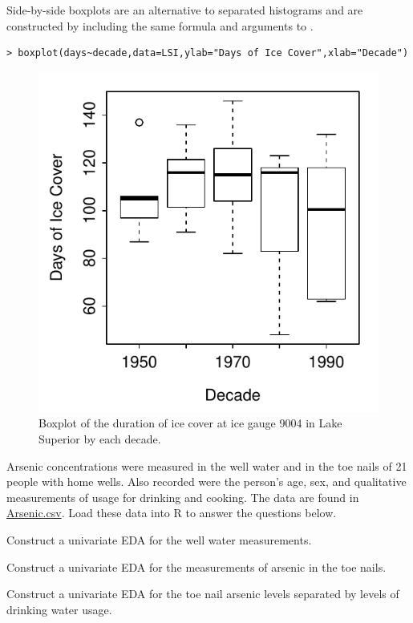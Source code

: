\documentclass[10pt,openany]{book}\usepackage[]{graphicx}\usepackage[]{color}
\makeatletter
\newenvironment{kframe}{%
 \def\at@end@of@kframe{}%
 \ifinner\ifhmode%
  \def\at@end@of@kframe{\end{minipage}}%
  \begin{minipage}{\columnwidth}%
 \fi\fi%
 \def\FrameCommand##1{\hskip\@totalleftmargin \hskip-\fboxsep
 \colorbox{shadecolor}{##1}\hskip-\fboxsep
     \hskip-\linewidth \hskip-\@totalleftmargin \hskip\columnwidth}%
 \MakeFramed {\advance\hsize-\width
   \@totalleftmargin\z@ \linewidth\hsize
   \@setminipage}}%
 {\par\unskip\endMakeFramed%
 \at@end@of@kframe}
\newenvironment{knitrout}{}{} %
\makeatother
\begin{document}
Side-by-side boxplots  are an alternative to separated histograms and are constructed by including the same formula and  arguments to .
\begin{knitrout}
\color{fgcolor}\begin{kframe}
\begin{verbatim}
> boxplot(days~decade,data=LSI,ylab="Days of Ice Cover",xlab="Decade")
\end{verbatim}
\end{kframe}\begin{figure}[hbtp]

{\centering \includegraphics[width=.4\linewidth]{Figs/Boxplot1-1} 

}

\caption[Boxplot of the duration of ice cover at ice gauge 9004 in Lake Superior by each decade]{Boxplot of the duration of ice cover at ice gauge 9004 in Lake Superior by each decade.}\label{fig:Boxplot1}
\end{figure}


\end{knitrout}

\clearpage
\begin{exsection}
  \item \label{revex:EDAArsenic1} \rhw{} Arsenic concentrations were measured in the well water and in the toe nails of 21 people with home wells.  Also recorded were the person's age, sex, and qualitative measurements of usage for drinking and cooking.  The data are found in \href{https://raw.githubusercontent.com/droglenc/NCData/master/Arsenic.csv}{Arsenic.csv}.  Load these data into R to answer the questions below. 
  \begin{Enumerate}
    \item Construct a univariate EDA for the well water measurements.
    \item Construct a univariate EDA for the measurements of arsenic in the toe nails.
    \item Construct a univariate EDA for the toe nail arsenic levels separated by levels of drinking water usage.
  \end{Enumerate}
\end{exsection}
\end{document}
